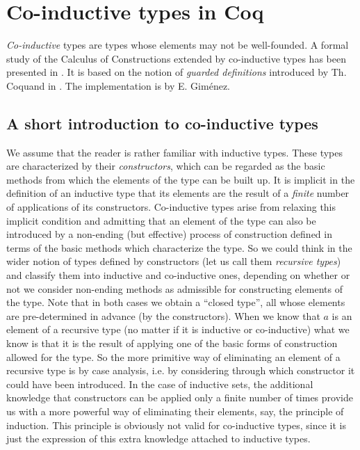 %
 
%
%

\chapter[Co-inductive types in Coq]{Co-inductive types in Coq\label{Co-inductives}}

{\it Co-inductive} types are types whose elements may not be well-founded.
A formal study of the Calculus of Constructions extended by 
co-inductive types has been presented
in \cite{Gim94}. It is based on the notion of
{\it guarded definitions} introduced by Th. Coquand
in \cite{Coquand93}. The implementation is by E. Gim\'enez.

\section{A short introduction to co-inductive types}

We assume that the reader is rather familiar with inductive types.
These types are characterized by their {\it constructors}, which can be 
regarded as the basic methods from which the elements 
of the type can be built up. It is implicit in the definition 
of an inductive type that 
its elements are the result of a {\it finite} number of 
applications of its constructors. Co-inductive types arise from 
relaxing this implicit condition and admitting that an element of
the type can also be introduced by a non-ending (but effective) process 
of construction defined in terms of the basic methods which characterize the
type. So we could think in the wider notion of types defined by
constructors (let us call them {\it recursive types}) and classify
them into inductive and co-inductive ones, depending on whether or not
we consider non-ending methods as admissible for constructing elements
of the type. Note that in both cases we obtain a ``closed type'', all whose 
elements are pre-determined in advance (by the constructors). When we
know that $a$ is an element of a recursive type (no matter if it is 
inductive or co-inductive) what we know is that it is the result of applying
one of the basic forms of construction allowed for the type.
So the more primitive way of eliminating an element of a recursive type is 
by case analysis, i.e. by considering through which constructor it could have
been introduced. In the case of inductive sets, the additional knowledge that
constructors can be applied only a finite number of times provide
us with a more powerful way of eliminating their elements, say,  
the principle of
induction. This principle is obviously not valid for co-inductive types,
since it is just the expression of this extra knowledge attached to inductive 
types.


